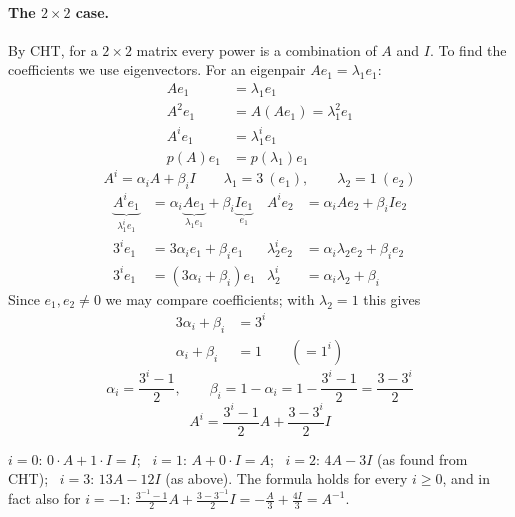 \paragraph{The $2\times 2$ case.}
By CHT, for a $2\times2$ matrix every power is a combination of $A$ and $I$. To find the coefficients we use eigenvectors.
For an eigenpair $Ae_1=\lambda_1e_1$:
\begin{align*}
Ae_1&=\lambda_1e_1\\
A^2e_1&=A(Ae_1)=\lambda_1^2e_1\\
A^ie_1&=\lambda_1^ie_1\\
p(A)e_1&=p(\lambda_1)e_1
\end{align*}
\[
\boxed{A^i=\alpha_iA+\beta_i I}\qquad
\lambda_1=3\ (e_1),\qquad \lambda_2=1\ (e_2)
\]
\begin{align*}
\underbrace{A^ie_1}_{\lambda_1^ie_1}&=\alpha_i\underbrace{Ae_1}_{\lambda_1e_1}+\beta_i\underbrace{Ie_1}_{e_1}
&
A^ie_2&=\alpha_iAe_2+\beta_iIe_2\\
3^ie_1&=3\alpha_ie_1+\beta_ie_1
&
\lambda_2^ie_2&=\alpha_i\lambda_2e_2+\beta_ie_2\\
3^ie_1&=(3\alpha_i+\beta_i)e_1
&
\lambda_2^i&=\alpha_i\lambda_2+\beta_i
\end{align*}
Since $e_1,e_2\neq0$ we may compare coefficients; with $\lambda_2=1$ this gives
\begin{align*}
3\alpha_i+\beta_i&=3^i\\
\alpha_i+\beta_i&=1 \qquad (=1^i)
\end{align*}
\[
\alpha_i=\frac{3^i-1}{2},\qquad \beta_i=1-\alpha_i=1-\frac{3^i-1}{2}=\frac{3-3^i}{2}
\]
\[
\boxed{A^i=\frac{3^i-1}{2}A+\frac{3-3^i}{2}I}
\]
\begin{insight}[Check]
$i=0$: $0\cdot A+1\cdot I=I$; \ $i=1$: $A+0\cdot I=A$; \ $i=2$: $4A-3I$ (as found from CHT); \ $i=3$: $13A-12I$ (as above). The formula holds for every $i\ge0$, and in fact also for $i=-1$: $\frac{3^{-1}-1}{2}A+\frac{3-3^{-1}}{2}I=-\frac A3+\frac{4I}{3}=A^{-1}$.
\end{insight}

